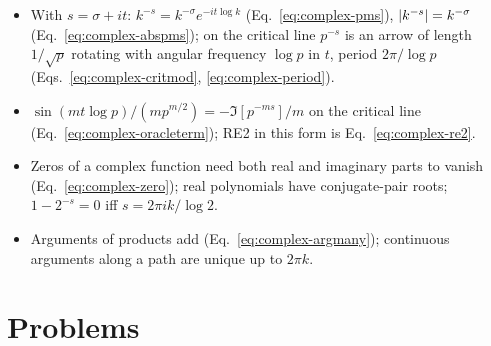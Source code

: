 \begin{itemize}
\item With $s=\sigma+it$: $k^{-s}=k^{-\sigma}e^{-it\log k}$ (Eq.~\eqref{eq:complex-pms}), $\left\lvert k^{-s}\right\rvert=k^{-\sigma}$ (Eq.~\eqref{eq:complex-abspms}); on the critical line $p^{-s}$ is an arrow of length $1/\sqrt p$ rotating with angular frequency $\log p$ in $t$, period $2\pi/\log p$ (Eqs.~\eqref{eq:complex-critmod}, \eqref{eq:complex-period}).
\item $\sin(mt\log p)/(mp^{m/2})=-\Im[p^{-ms}]/m$ on the critical line (Eq.~\eqref{eq:complex-oracleterm}); RE2 in this form is Eq.~\eqref{eq:complex-re2}.
\item Zeros of a complex function need both real and imaginary parts to vanish (Eq.~\eqref{eq:complex-zero}); real polynomials have conjugate-pair roots; $1-2^{-s}=0$ iff $s=2\pi ik/\log2$.
\item Arguments of products add (Eq.~\eqref{eq:complex-argmany}); continuous arguments along a path are unique up to $2\pi k$.
\end{itemize}

\section{Problems}

